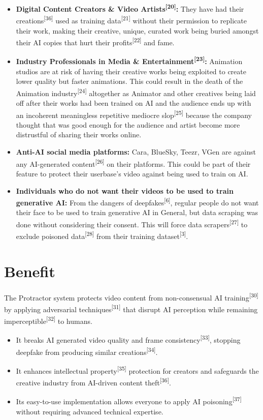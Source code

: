 \begin{itemize}
    \item \textbf{Digital Content Creators \& Video Artists\textsuperscript{[20]}:} They have had their creations\textsuperscript{[36]} used as training data\textsuperscript{[21]} without their permission to replicate their work, making their creative, unique, curated work being buried amongst their AI copies that hurt their profits\textsuperscript{[22]} and fame.
    \item \textbf{Industry Professionals in Media \& Entertainment\textsuperscript{[23]}:} Animation studios are at risk of having their creative works being exploited to create lower quality but faster animations. This could result in the death of the Animation industry\textsuperscript{[24]} altogether as Animator and other creatives being laid off after their works had been trained on AI and the audience ends up with an incoherent meaningless repetitive mediocre slop\textsuperscript{[25]} because the company thought that was good enough for the audience and artist become more distrustful of sharing their works online.

    \item \textbf{Anti-AI social media platforms:} Cara, BlueSky, Teezr, VGen are against any AI-generated content\textsuperscript{[26]} on their platforms. This could be part of their feature to protect their userbase’s video against being used to train on AI.
    \item \textbf{Individuals who do not want their videos to be used to train generative AI:} From the dangers of deepfakes\textsuperscript{[6]}, regular people do not want their face to be used to train generative AI in General, but data scraping was done without considering their consent. This will force data scrapers\textsuperscript{[27]} to exclude poisoned data\textsuperscript{[28]} from their training dataset\textsuperscript{[3]}.
\end{itemize}

\section{Benefit}
\label{section:benefit}
The Protractor system protects video content from non-consensual AI training\textsuperscript{[30]} by applying adversarial techniques\textsuperscript{[31]} that disrupt AI perception while remaining imperceptible\textsuperscript{[32]} to humans.

\begin{itemize}
    \item It breaks AI generated video quality and frame consistency\textsuperscript{[33]}, stopping deepfake from producing similar creations\textsuperscript{[34]}. 
    \item It enhances intellectual property\textsuperscript{[35]} protection for creators and safeguards the creative industry from AI-driven content theft\textsuperscript{[36]}.
    \item Its easy-to-use implementation allows everyone to apply AI poisoning\textsuperscript{[37]} without requiring advanced technical expertise.
\end{itemize}

